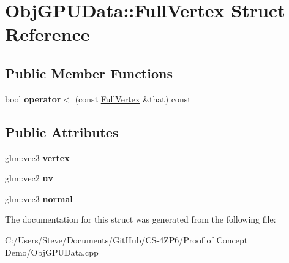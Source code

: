 \hypertarget{struct_obj_g_p_u_data_1_1_full_vertex}{}\section{Obj\+G\+P\+U\+Data\+:\+:Full\+Vertex Struct Reference}
\label{struct_obj_g_p_u_data_1_1_full_vertex}
\subsection*{Public Member Functions}
\begin{DoxyCompactItemize}
\item 
bool {\bfseries operator$<$} (const \hyperlink{struct_obj_g_p_u_data_1_1_full_vertex}{Full\+Vertex} \&that) const \hypertarget{struct_obj_g_p_u_data_1_1_full_vertex_ae3da8a71f132a766a743fdb8f4682a66}{}\label{struct_obj_g_p_u_data_1_1_full_vertex_ae3da8a71f132a766a743fdb8f4682a66}

\end{DoxyCompactItemize}
\subsection*{Public Attributes}
\begin{DoxyCompactItemize}
\item 
glm\+::vec3 {\bfseries vertex}\hypertarget{struct_obj_g_p_u_data_1_1_full_vertex_add2937d4afe5fddc2517745902112df0}{}\label{struct_obj_g_p_u_data_1_1_full_vertex_add2937d4afe5fddc2517745902112df0}

\item 
glm\+::vec2 {\bfseries uv}\hypertarget{struct_obj_g_p_u_data_1_1_full_vertex_aaa19f67d38d6023a3f6c01dd55be5003}{}\label{struct_obj_g_p_u_data_1_1_full_vertex_aaa19f67d38d6023a3f6c01dd55be5003}

\item 
glm\+::vec3 {\bfseries normal}\hypertarget{struct_obj_g_p_u_data_1_1_full_vertex_abb470ab7c198207e703eeddf2f422494}{}\label{struct_obj_g_p_u_data_1_1_full_vertex_abb470ab7c198207e703eeddf2f422494}

\end{DoxyCompactItemize}


The documentation for this struct was generated from the following file\+:\begin{DoxyCompactItemize}
\item 
C\+:/\+Users/\+Steve/\+Documents/\+Git\+Hub/\+C\+S-\/4\+Z\+P6/\+Proof of Concept Demo/Obj\+G\+P\+U\+Data.\+cpp\end{DoxyCompactItemize}
